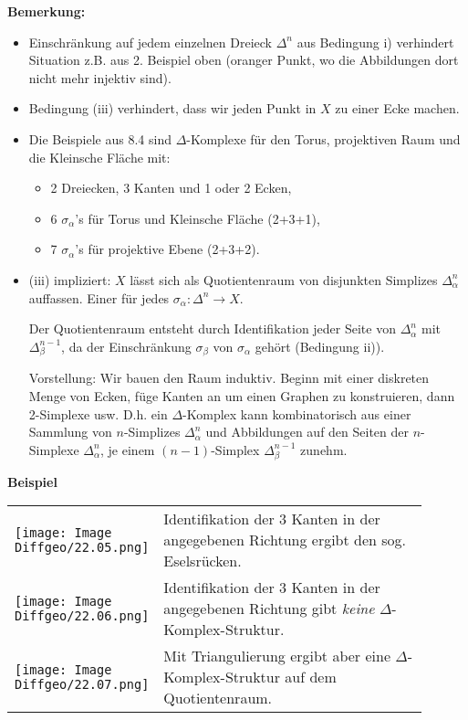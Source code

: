 \documentclass[fleqn, 12pt, letterpaper]{article}
\begin{document}
\textbf{Bemerkung:}
\begin{itemize}
\item Einschränkung auf jedem einzelnen Dreieck $\Delta ^n$ aus Bedingung i) verhindert Situation z.B. aus 2. Beispiel oben (oranger Punkt, wo die Abbildungen dort nicht mehr injektiv sind).
  \item Bedingung (iii) verhindert, dass wir jeden Punkt in \( X \) zu einer Ecke machen.

  \item Die Beispiele aus 8.4 sind \(\Delta\)-Komplexe für den Torus, projektiven Raum und die Kleinsche Fläche mit:
  \begin{itemize}
    \item 2 Dreiecken, 3 Kanten und 1 oder 2 Ecken,
    \item 6 \(\sigma_\alpha\)'s für Torus und Kleinsche Fläche (2+3+1),
    \item 7 \(\sigma_\alpha\)'s für projektive Ebene (2+3+2).
  \end{itemize}

  \item (iii) impliziert: \(X\) lässt sich als Quotientenraum von disjunkten Simplizes \(\Delta^n_\alpha\) auffassen. Einer für jedes \(\sigma_\alpha \colon \Delta^n \to X\).

  \medskip
  Der Quotientenraum entsteht durch Identifikation jeder Seite von \(\Delta^n_\alpha\) mit \(\Delta^{n-1}_\beta\), da der Einschränkung \(\sigma_\beta\) von \(\sigma_\alpha\) gehört (Bedingung ii)).

  \medskip
  Vorstellung: Wir bauen den Raum induktiv. Beginn mit einer diskreten Menge von Ecken, füge Kanten an um einen Graphen zu konstruieren, dann 2-Simplexe usw.
  D.h. ein \(\Delta\)-Komplex kann kombinatorisch aus einer Sammlung von \(n\)-Simplizes \(\Delta^n_\alpha\) und Abbildungen auf den Seiten der \(n\)-Simplexe \(\Delta^n_\alpha\), je einem \((n-1)\)-Simplex \(\Delta^{n-1}_\beta\) zunehm.
\end{itemize}

\textbf{Beispiel}

\begin{center}
\setlength{\extrarowheight}{5.0ex}
\begin{tabular}{>{\centering\arraybackslash}m{0.25\linewidth} >{\raggedright\arraybackslash}m{0.65\linewidth}}
  \texttt{[image: Image Diffgeo/22.05.png]} & 
  Identifikation der 3 Kanten in der angegebenen Richtung ergibt den sog. Eselsrücken. \\
  
  \texttt{[image: Image Diffgeo/22.06.png]} & 
  Identifikation der 3 Kanten in der angegebenen Richtung gibt \textit{keine} $\Delta$-Komplex-Struktur. \\
  
  \texttt{[image: Image Diffgeo/22.07.png]} & 
  Mit Triangulierung ergibt aber eine $\Delta$-Komplex-Struktur auf dem Quotientenraum. \\
\end{tabular}
\end{center}
\end{document}
